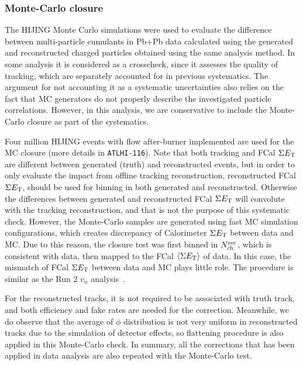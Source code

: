 \subsubsection{Monte-Carlo closure}

The HIJING Monte Carlo simulations were used to evaluate the difference between multi-particle cumulants in Pb+Pb data calculated using the generated and reconstructed charged particles obtained using the same analysis method. In some analysis it is considered as a crosscheck, since it assesses the quality of tracking, which are separately accounted for in previous systematics. The argument for not accounting it as a systematic uncertainties also relies on the fact that MC generators do not properly describe the investigated particle correlations. However, in this analysis, we are conservative to include the Monte-Carlo closure as part of the systematics.

Four million HIJING events with flow after-burner implemented are used for the MC closure (more details in \verb|ATLHI-116|). Note that both tracking and FCal $\Sigma E_\text{T}$ are different between generated (truth) and reconstructed events, but in order to only evaluate the impact from offline tracking reconstruction, reconstructed FCal $\Sigma E_\text{T}$, should be used for binning in both generated and reconstructed. Otherwise the differences between generated and reconstructed FCal $\Sigma E_\text{T}$ will convolute with the tracking reconstruction, and that is not the purpose of this systematic check. However, the Monte-Carlo samples are generated using fast MC simulation configurations, which creates discrepancy of Calorimeter $\Sigma E_\text{T}$ between data and MC. Due to this reason, the closure test was first binned in $N_\text{ch}^\text{rec}$, which is consistent with data, then mapped to the FCal $\left\langle \Sigma E_\text{T}\right\rangle$ of data. In this case, the mismatch of FCal $\Sigma E_\text{T}$ between data and MC plays little role. The procedure is similar as the Run 2 $v_n$ analysis~\cite{Burka:2151932}.

For the reconstructed tracks, it is not required to be associated with truth track, and both efficiency and fake rates are needed for the correction. Meanwhile, we do observe that the average of $\phi$ distribution is not very uniform in reconstructed tracks due to the simulation of detector effects, so flattening procedure is also applied in this Monte-Carlo check. In summary, all the corrections that has been applied in data analysis are also repeated with the Monte-Carlo test.

